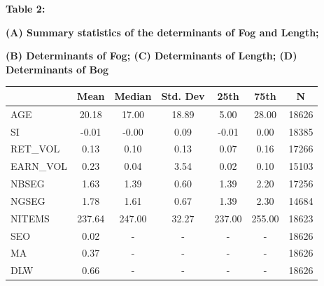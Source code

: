 \documentclass[a4paper]{article}
\begin{document}
\vspace{1em}
{\normalsize \textbf{Table 2: } \par}
{\normalsize \textbf{(A) Summary statistics of the determinants of Fog and Length;} \par}
{\normalsize \textbf{(B) Determinants of Fog; (C) Determinants of Length; (D) Determinants of Bog} \par}


\begin{subtable}[t]{\textwidth}
\centering
\begin{tabular}{lcccccc}
  \hline
 & Mean & Median & Std. Dev & 25th & 75th & N \\ 
  \hline
AGE & 20.18 & 17.00 & 18.89 & 5.00 & 28.00 & 18626 \\ 
  SI & -0.01 & -0.00 & 0.09 & -0.01 & 0.00 & 18385 \\ 
  RET\_VOL & 0.13 & 0.10 & 0.13 & 0.07 & 0.16 & 17266 \\ 
  EARN\_VOL & 0.23 & 0.04 & 3.54 & 0.02 & 0.10 & 15103 \\ 
  NBSEG & 1.63 & 1.39 & 0.60 & 1.39 & 2.20 & 17256 \\ 
  NGSEG & 1.78 & 1.61 & 0.67 & 1.39 & 2.30 & 14684 \\ 
  NITEMS & 237.64 & 247.00 & 32.27 & 237.00 & 255.00 & 18623 \\ 
  SEO & 0.02 & - & - & - & - & 18626 \\ 
  MA & 0.37 & - & - & - & - & 18626 \\ 
  DLW & 0.66 & - & - & - & - & 18626 \\ 
  \bottomrule
\end{tabular}
\end{subtable}

\vspace{1cm}
\end{document}
